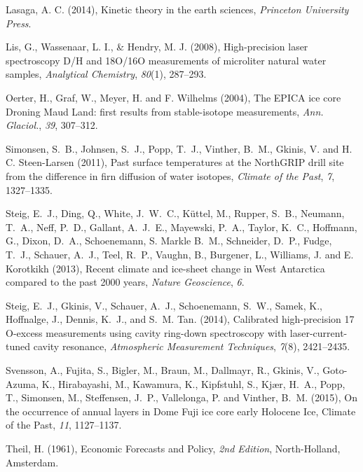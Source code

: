 \documentclass[draft, jgrga]{AGUTeX}
\begin{document}
\begin{article}
\begin{thebibliography}{}
Lasaga, A. C. (2014),
{Kinetic theory in the earth sciences},
\textit{Princeton University Press}.

Lis, G., Wassenaar, L. I., \& Hendry, M. J. (2008),
{High-precision laser spectroscopy D/H and 18O/16O measurements of microliter natural water samples},
\textit{Analytical Chemistry}, \textit{80}(1), 287--293.

Oerter, H., Graf, W., Meyer, H. and F. Wilhelms (2004),
{The EPICA ice core Droning Maud Land: first results from stable-isotope measurements},
\textit{Ann. Glaciol.}, \textit{39}, 307--312.

Simonsen, S.~B., Johnsen, S.~J., Popp, T.~J., Vinther, B.~M., Gkinis, V. and H. C. Steen-Larsen (2011),
{Past surface temperatures at the NorthGRIP drill site from the difference in firn diffusion of water isotopes},
\textit{Climate of the Past}, \textit{7}, 1327--1335.

Steig, E.~J., Ding, Q., White, J.~W.~C., Küttel, M., Rupper, S.~B., Neumann, T.~A., Neff, P.~D., Gallant, A.~J.~E., Mayewski, P.~A.,
Taylor, K.~C., Hoffmann, G., Dixon, D.~A., Schoenemann, S. Markle B.~M., Schneider, D.~P., Fudge, T.~J.,
Schauer, A.~J., Teel, R.~P., Vaughn, B., Burgener, L., Williams, J. and E. Korotkikh (2013),
{Recent climate and ice-sheet change in West Antarctica compared to the past 2000 years},
\textit{Nature Geoscience}, \textit{6}.

 Steig, E.~J., Gkinis, V., Schauer, A.~J., Schoenemann, S.~W., Samek, K., Hoffnalge, J., Dennis, K.~J., and S.~M. Tan. (2014), {Calibrated high-precision 17 O-excess measurements using cavity ring-down spectroscopy with laser-current-tuned cavity resonance}, \textit{Atmospheric Measurement Techniques}, \textit{7}(8), 2421--2435.

Svensson, A., Fujita, S., Bigler, M., Braun, M., Dallmayr, R., Gkinis, V.,
Goto-Azuma, K., Hirabayashi, M., Kawamura, K., Kipfstuhl, S., Kjær, H.~A.,
Popp, T., Simonsen, M., Steffensen, J.~P., Vallelonga, P. and Vinther, B.~M. (2015),
{On the occurrence of annual layers in Dome Fuji ice core early Holocene Ice},
{Climate of	the Past}, \textit{11}, 1127--1137.

Theil, H. (1961),
{Economic Forecasts and Policy},
\textit{2nd Edition}, North-Holland, Amsterdam.


\end{thebibliography}
\end{article}
\end{document}
